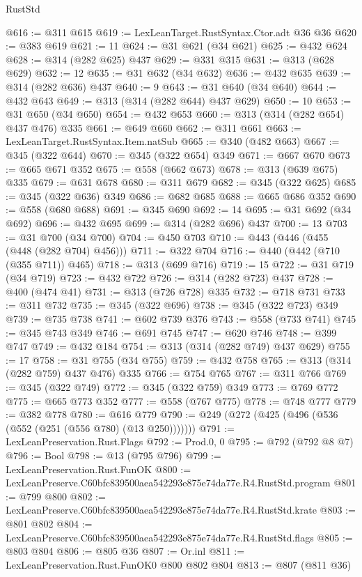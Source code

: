 \begin{lexlean}{RustStd}
\begin{coremodule}
@616 := @311 @615
@619 := LexLeanTarget.RustSyntax.Ctor.adt @36 @36
@620 := @383 @619
@621 := 11
@624 := @31 @621 (@34 @621)
@625 := @432 @624
@628 := @314 (@282 @625) @437
@629 := @331 @315
@631 := @313 (@628 @629)
@632 := 12
@635 := @31 @632 (@34 @632)
@636 := @432 @635
@639 := @314 (@282 @636) @437
@640 := 9
@643 := @31 @640 (@34 @640)
@644 := @432 @643
@649 := @313 (@314 (@282 @644) @437 @629)
@650 := 10
@653 := @31 @650 (@34 @650)
@654 := @432 @653
@660 := @313 (@314 (@282 @654) @437 @476) @335
@661 := @649 @660
@662 := @311 @661
@663 := LexLeanTarget.RustSyntax.Item.natSub
@665 := @340 (@482 @663)
@667 := @345 (@322 @644)
@670 := @345 (@322 @654) @349
@671 := @667 @670
@673 := @665 @671 @352
@675 := @558 (@662 @673)
@678 := @313 (@639 @675) @335
@679 := @631 @678
@680 := @311 @679
@682 := @345 (@322 @625)
@685 := @345 (@322 @636) @349
@686 := @682 @685
@688 := @665 @686 @352
@690 := @558 (@680 @688)
@691 := @345 @690
@692 := 14
@695 := @31 @692 (@34 @692)
@696 := @432 @695
@699 := @314 (@282 @696) @437
@700 := 13
@703 := @31 @700 (@34 @700)
@704 := @450 @703
@710 := @443 (@446 (@455 (@448 (@282 @704) @456)))
@711 := @322 @704
@716 := @440 (@442 (@710 (@355 @711)) @465)
@718 := @313 (@699 @716)
@719 := 15
@722 := @31 @719 (@34 @719)
@723 := @432 @722
@726 := @314 (@282 @723) @437
@728 := @400 (@474 @41)
@731 := @313 (@726 @728) @335
@732 := @718 @731
@733 := @311 @732
@735 := @345 (@322 @696)
@738 := @345 (@322 @723) @349
@739 := @735 @738
@741 := @602 @739 @376
@743 := @558 (@733 @741)
@745 := @345 @743 @349
@746 := @691 @745
@747 := @620 @746
@748 := @399 @747
@749 := @432 @184
@754 := @313 (@314 (@282 @749) @437 @629)
@755 := 17
@758 := @31 @755 (@34 @755)
@759 := @432 @758
@765 := @313 (@314 (@282 @759) @437 @476) @335
@766 := @754 @765
@767 := @311 @766
@769 := @345 (@322 @749)
@772 := @345 (@322 @759) @349
@773 := @769 @772
@775 := @665 @773 @352
@777 := @558 (@767 @775)
@778 := @748 @777
@779 := @382 @778
@780 := @616 @779
@790 := @249 (@272 (@425 (@496 (@536 (@552 (@251 (@556 @780) (@13 @250)))))))
@791 := LexLeanPreservation.Rust.Flags
@792 := Prod.{0, 0}
@795 := @792 (@792 @8 @7)
@796 := Bool
@798 := @13 (@795 @796)
@799 := LexLeanPreservation.Rust.FunOK
@800 := LexLeanPreserve.C60bfc839500aea542293e875e74da77e.R4.RustStd.program
@801 := @799 @800
@802 := LexLeanPreserve.C60bfc839500aea542293e875e74da77e.R4.RustStd.krate
@803 := @801 @802
@804 := LexLeanPreserve.C60bfc839500aea542293e875e74da77e.R4.RustStd.flags
@805 := @803 @804
@806 := @805 @36
@807 := Or.inl
@811 := LexLeanPreservation.Rust.FunOK0 @800 @802 @804
@813 := @807 (@811 @36)

\end{coremodule}
\end{lexlean}
